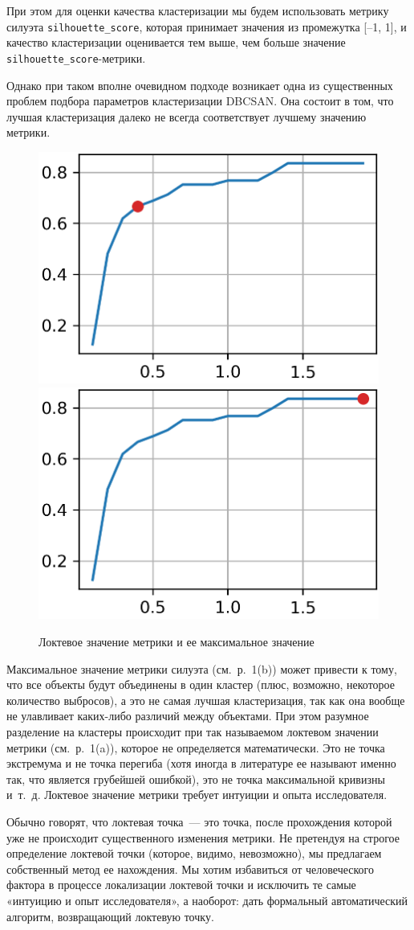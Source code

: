 \documentclass[a4paper,12pt]{article}
\begin{document}
\medskip\noindent 
При этом для оценки качества кластеризации мы будем использовать метрику силуэта \texttt{silhouette\_score}, которая принимает значения из промежутка [–1, 1], и качество кластеризации оценивается тем выше, чем больше значение \texttt{silhouette\_score}-метрики.

Однако при таком вполне очевидном подходе возникает одна из существенных проблем подбора параметров кластеризации DBCSAN. Она состоит в том, что лучшая кластеризация далеко не всегда соответствует лучшему значению метрики. 


\begin{figure}[!h]
	\centering
	\includegraphics[width=0.4\linewidth]{pictures/Локтевая метрика}
	\hspace{0.05\linewidth}
	\includegraphics[width=0.4\linewidth]{pictures/Максимальная метрика}\\
	\caption{Локтевое значение метрики и ее максимальное значение}
\end{figure}


Максимальное значение метрики силуэта (см. р. 1(b)) может привести к тому, что все объекты будут объединены в один кластер (плюс, возможно, некоторое количество выбросов), а это не самая лучшая кластеризация, так как она вообще не улавливает каких-либо различий между объектами. При этом разумное разделение на кластеры происходит при так называемом локтевом значении метрики (см. р. 1(a)), которое не определяется математически. Это не точка экстремума и не точка перегиба (хотя иногда в литературе ее называют именно так, что является грубейшей ошибкой), это не точка максимальной кривизны и т. д. Локтевое значение метрики требует интуиции и опыта исследователя.

Обычно говорят, что локтевая точка — это точка, после прохождения которой уже не происходит существенного изменения метрики. Не претендуя на строгое определение локтевой точки (которое, видимо, невозможно), мы предлагаем собственный метод ее нахождения. Мы хотим избавиться от человеческого фактора в процессе локализации локтевой точки и исключить те самые «интуицию и опыт исследователя», а наоборот: дать формальный автоматический алгоритм, возвращающий локтевую точку.
\end{document}
